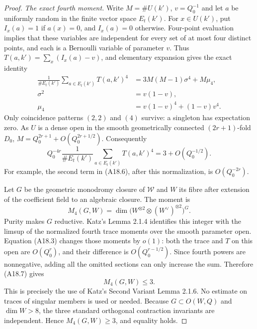 \documentclass[11pt]{article}
\theoremstyle{remark}\newtheorem{remark}[theorem]{Remark}
\begin{document}
\begin{proof}
\emph{The exact fourth moment.}
Write $M=\#U(k')$, $v=Q_0^{-1}$ and let $a$ be uniformly random
in the finite vector space $E_t(k')$. For $x\in U(k')$, put
$I_x(a)=1$ if $a(x)=0$, and $I_x(a)=0$ otherwise. Four-point
evaluation implies that these variables are independent for
every set of at most four distinct points, and each is a
Bernoulli variable of parameter $v$. Thus
$T(a,k')=\sum_x(I_x(a)-v)$, and elementary expansion gives the
exact identity
\[
 \begin{split}
 \frac{1}{\#E_t(k')}\sum_{a\in E_t(k')} T(a,k')^4
   &=3M(M-1)\sigma^4+M\mu_4,\\
 \sigma^2&=v(1-v),\\
 \mu_4&=v(1-v)^4+(1-v)v^4.
 \end{split}                                                   \tag{A18.6}
\]
Only coincidence patterns $(2,2)$ and $(4)$ survive: a singleton
has expectation zero. As $U$ is a dense open in the smooth
geometrically connected $(2r+1)$-fold $D_0$,
$M=Q_0^{2r+1}+O(Q_0^{2r+1/2})$. Consequently
\[
 Q_0^{-4r}\frac{1}{\#E_t(k')}
       \sum_{a\in E_t(k')}T(a,k')^4
                   =3+O(Q_0^{-1/2}).                         \tag{A18.7}
\]
For example, the second term in (A18.6), after this normalization,
is $O(Q_0^{-2r})$.

Let $G$ be the geometric monodromy closure of $\mathcal W$ and
$W$ its fibre after extension of the coefficient field to an
algebraic closure. The moment is
\[
        M_4(G,W)=\dim\bigl(W^{\otimes2}\otimes
                                  (W^\vee)^{\otimes2}\bigr)^G.
\]
Purity makes $G$ reductive. Katz's Lemma 2.1.4 identifies this
integer with the limsup of the normalized fourth trace moments
over the smooth parameter open. Equation (A18.3) changes those
moments by $o(1)$: both the trace and $T$ on this open are
$O(Q_0^r)$, and their difference is $O(Q_0^{r-1/2})$.
Since fourth powers are nonnegative, adding all the omitted
sections can only increase the sum. Therefore (A18.7) gives
\[
                         M_4(G,W)\leq3.                       \tag{A18.8}
\]
This is precisely the use of Katz's Second Variant Lemma 2.1.6.
No estimate on traces of singular members is used or needed.
Because $G\subset O(W,Q)$ and $\dim W>8$, the three standard
orthogonal contraction invariants are independent. Hence
$M_4(G,W)\geq3$, and equality holds.


\end{proof}
\end{document}
